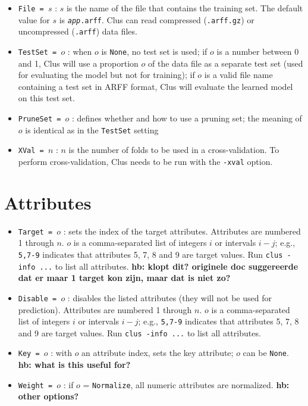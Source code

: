 \documentclass[a4paper]{report}
\begin{document}
\begin{itemize}
\item {\tt File = $s$} : $s$ is the name of the file that contains the training set.  The default value for $s$ is {\tt {\em app}.arff}.  Clus can read compressed ({\tt .arff.gz}) or uncompressed ({\tt .arff}) data files.
\item {\tt TestSet = $o$} : when $o$ is {\tt None}, no test set is used; if $o$ is a number between 0 and 1, Clus will use a proportion $o$ of the data file as a separate test set (used for evaluating the model but not for training); if $o$ is a valid file name containing a test set in ARFF format, Clus will evaluate the learned model on this test set.
\item {\tt PruneSet = $o$} : defines whether and how to use a pruning set; the meaning of $o$ is identical as in the {\tt TestSet} setting
\item {\tt XVal = $n$} : $n$ is the number of folds to be used in a cross-validation.  To perform cross-validation, Clus needs to be run with the {\tt -xval} option.
\end{itemize}

\section{Attributes}

\begin{itemize}
\item {\tt Target = $o$} : sets the index of the target attributes.  Attributes are numbered 1 through $n$.  $o$ is a comma-separated list of integers $i$ or intervals $i-j$; e.g., {\tt 5,7-9} indicates that attributes 5, 7, 8 and 9 are target values.  Run {\tt clus -info ...} to list all attributes.
{\bf * hb: klopt dit? originele doc suggereerde dat er maar 1 target kon zijn, maar dat is niet zo?}
\item {\tt Disable = $o$} : disables the listed attributes (they will not be used for prediction).  Attributes are numbered 1 through $n$.  $o$ is a comma-separated list of integers $i$ or intervals $i-j$; e.g., {\tt 5,7-9} indicates that attributes 5, 7, 8 and 9 are target values.  Run {\tt clus -info ...} to list all attributes.
\item {\tt Key = $o$} : with $o$ an attribute index, sets the key attribute; $o$ can be {\tt None}. 
   {\bf * hb: what is this useful for?}
\item {\tt Weight = $o$} : if $o$ = {\tt Normalize}, all numeric attributes are normalized.
   {\bf * hb: other options?}
\end{itemize}
\end{document}
